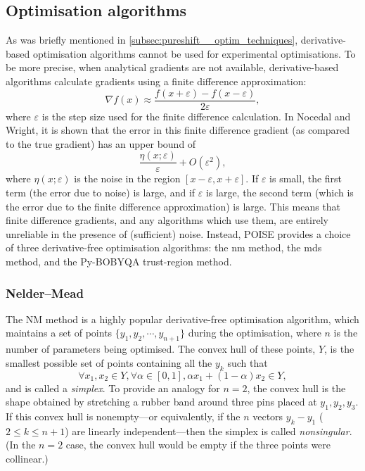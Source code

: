 \subsection{Optimisation algorithms}
\label{subsec:poise__algorithms}

As was briefly mentioned in \cref{subsec:pureshift__optim_techniques}, derivative-based optimisation algorithms cannot be used for experimental optimisations.
To be more precise, when analytical gradients are not available, derivative-based algorithms calculate gradients using a finite difference approximation:
\begin{equation}
    \label{eq:finite_difference_grad}
    \nabla f(x) \approx \frac{f(x + \varepsilon) - f(x - \varepsilon)}{2\varepsilon},
\end{equation}
where $\varepsilon$ is the step size used for the finite difference calculation.
In Nocedal and Wright\autocite{Nocedal2006}, it is shown that the error in this finite difference gradient (as compared to the true gradient) has an upper bound of
\begin{equation}
    \label{eq:finite_difference_error}
    \frac{\eta(x;\varepsilon)}{\varepsilon} + O(\varepsilon^2),
\end{equation}
where $\eta(x;\varepsilon)$ is the noise in the region $[x - \varepsilon, x + \varepsilon]$.
If $\varepsilon$ is small, the first term (the error due to noise) is large, and if $\varepsilon$ is large, the second term (which is the error due to the finite difference approximation) is large.
This means that finite difference gradients, and any algorithms which use them, are entirely unreliable in the presence of (sufficient) noise.
Instead, POISE provides a choice of three derivative-free optimisation algorithms: the \acf{nm} method\autocite{Nelder1965TCJ}, the \acf{mds} method\autocite{Torczon1989,DennisJr1991SIAMJO}, and the Py-BOBYQA trust-region method\autocite{Powell2009Proc,Cartis2019ACMTMS}.


\subsubsection{Nelder--Mead}

The NM method is a highly popular derivative-free optimisation algorithm, which maintains a set of points $\{y_1, y_2, \cdots, y_{n+1}\}$ during the optimisation, where $n$ is the number of parameters being optimised.
The convex hull of these points, $Y$, is the smallest possible set of points containing all the $y_k$ such that
\begin{equation}
    \label{eq:convex_hull}
    \forall x_1, x_2 \in Y, \forall \alpha \in [0, 1], \alpha x_1 + (1 - \alpha) x_2 \in Y,
\end{equation}
and is called a \textit{simplex}.
To provide an analogy for $n = 2$, the convex hull is the shape obtained by stretching a rubber band around three pins placed at $y_1, y_2, y_3$.
If this convex hull is nonempty---or equivalently, if the $n$ vectors $y_k - y_1$ ($2 \leq k \leq n + 1$) are linearly independent---then the simplex is called \textit{nonsingular}.
(In the $n = 2$ case, the convex hull would be empty if the three points were collinear.)

